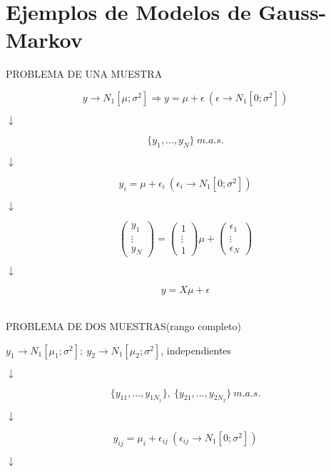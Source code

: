 \documentclass[10pt,a4paper]{book}
\begin{document}
	\section{Ejemplos de Modelos de Gauss-Markov}
\begin{center}
PROBLEMA DE UNA MUESTRA
\end{center}
$$y \rightarrow N_1[\mu;\sigma^2] \Rightarrow y=\mu + \epsilon\  (\epsilon \rightarrow N_1[0;\sigma^2])$$
\begin{center}
$ \downarrow $
\end{center}
$$\{y_1,...,y_N\}\ m.a.s.$$
\begin{center}
$ \downarrow $
\end{center}
$$y_i=\mu + \epsilon_i\  (\epsilon_i \rightarrow N_1[0;\sigma^2])$$
\begin{center}
$ \downarrow $
\end{center}
$$ \left( \begin{array}{c}
y_1\\
\vdots\\
y_N \end{array} \right) =  
\left( \begin{array}{c}
1\\
\vdots\\
1 \end{array} \right)\mu + 
\left( \begin{array}{c}
\epsilon_1\\
\vdots\\
\epsilon_N \end{array} \right)$$
\begin{center}
$ \downarrow $
\end{center}
$$y=X\mu+\epsilon$$
\ \\
\begin{center}
PROBLEMA DE DOS MUESTRAS(rango completo)
\end{center}
\begin{center}
$y_1 \rightarrow N_1[\mu_1;\sigma^2];\ y_2 \rightarrow N_1[\mu_2;\sigma^2]$, independientes
\end{center}
\begin{center}
$ \downarrow $
\end{center}
$$\{y_{11},...,y_{1N_1}\},\ \{y_{21},...,y_{2N_2}\}\ m.a.s.$$
\begin{center}
$ \downarrow $
\end{center}
$$y_{ij}=\mu_i + \epsilon_{ij}\  (\epsilon_{ij} \rightarrow N_1[0;\sigma^2])$$
\begin{center}
$ \downarrow $
\end{center}
\end{document}
